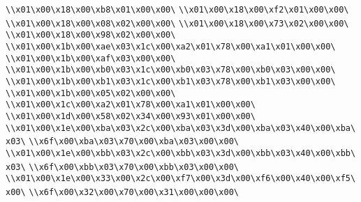 \verb|\\x01\x00\x18\x00\xb8\x01\x00\x00\|\newline
\verb|\\x01\x00\x18\x00\xf2\x01\x00\x00\|\newline
\verb|\\x01\x00\x18\x00\x08\x02\x00\x00\|\newline
\verb|\\x01\x00\x18\x00\x73\x02\x00\x00\|\newline
\verb|\\x01\x00\x18\x00\x98\x02\x00\x00\|\newline
\verb|\\x01\x00\x1b\x00\xae\x03\x1c\x00\xa2\x01\x78\x00\xa1\x01\x00\x00\|\newline
\verb|\\x01\x00\x1b\x00\xaf\x03\x00\x00\|\newline
\verb|\\x01\x00\x1b\x00\xb0\x03\x1c\x00\xb0\x03\x78\x00\xb0\x03\x00\x00\|\newline
\verb|\\x01\x00\x1b\x00\xb1\x03\x1c\x00\xb1\x03\x78\x00\xb1\x03\x00\x00\|\newline
\verb|\\x01\x00\x1b\x00\x05\x02\x00\x00\|\newline
\verb|\\x01\x00\x1c\x00\xa2\x01\x78\x00\xa1\x01\x00\x00\|\newline
\verb|\\x01\x00\x1d\x00\x58\x02\x34\x00\x93\x01\x00\x00\|\newline
\verb|\\x01\x00\x1e\x00\xba\x03\x2c\x00\xba\x03\x3d\x00\xba\x03\x40\x00\xba\x03\|\newline
\verb|\\x6f\x00\xba\x03\x70\x00\xba\x03\x00\x00\|\newline
\verb|\\x01\x00\x1e\x00\xbb\x03\x2c\x00\xbb\x03\x3d\x00\xbb\x03\x40\x00\xbb\x03\|\newline
\verb|\\x6f\x00\xbb\x03\x70\x00\xbb\x03\x00\x00\|\newline
\verb|\\x01\x00\x1e\x00\x33\x00\x2c\x00\xf7\x00\x3d\x00\xf6\x00\x40\x00\xf5\x00\|\newline
\verb|\\x6f\x00\x32\x00\x70\x00\x31\x00\x00\x00\|\newline
